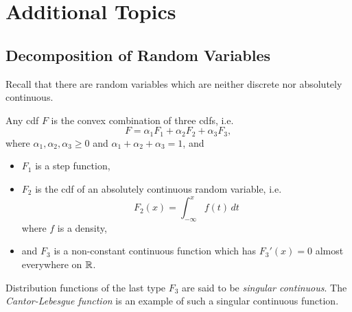\chapter{Additional Topics}

\section{Decomposition of Random Variables}
\begin{remark}
  Recall that there are random variables
  which are neither discrete nor absolutely
  continuous.
\end{remark}

\begin{theorem}
  Any cdf $F$ is the convex combination of
  three cdfs, i.e.
  \[
    F = \alpha_1 F_1 + \alpha_2 F_2 + \alpha_3 F_3,
  \]
  where $\alpha_1, \alpha_2, \alpha_3 \ge 0$
  and $\alpha_1 + \alpha_2 + \alpha_3 = 1$, and
  \begin{itemize}
    \item $F_1$ is a step function,
    \item $F_2$ is the cdf of an absolutely
      continuous random variable, i.e.
      \[
        F_2(x) = \int_{-\infty}^x f(t) \, dt
      \]
      where $f$ is a density,
    \item and $F_3$ is a non-constant continuous
      function which has $F_3'(x) = 0$ almost
      everywhere on $\mathbb{R}$.
  \end{itemize}
\end{theorem}

\begin{remark}
  Distribution functions of the last type $F_3$
  are said to be \emph{singular continuous}.
  The \emph{Cantor-Lebesgue function} is an example of
  such a singular continuous function.
\end{remark}
